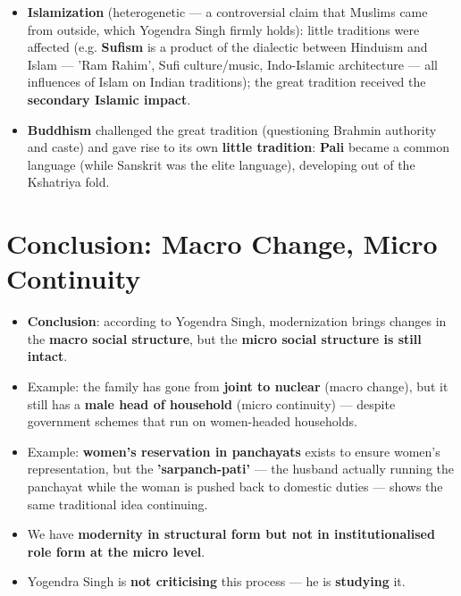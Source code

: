 \begin{KeyConcept}
\begin{itemize}
\item \textbf{Islamization} (heterogenetic --- a controversial claim that Muslims came from outside, which Yogendra Singh firmly holds): little traditions were affected (e.g. \textbf{Sufism} is a product of the dialectic between Hinduism and Islam --- 'Ram Rahim', Sufi culture/music, Indo-Islamic architecture --- all influences of Islam on Indian traditions); the great tradition received the \textbf{secondary Islamic impact}.
\item \textbf{Buddhism} challenged the great tradition (questioning Brahmin authority and caste) and gave rise to its own \textbf{little tradition}: \textbf{Pali} became a common language (while Sanskrit was the elite language), developing out of the Kshatriya fold.
\end{itemize}
\end{KeyConcept}

\section{Conclusion: Macro Change, Micro Continuity}

\begin{KeyConcept}
\begin{itemize}
\item \textbf{Conclusion}: according to Yogendra Singh, modernization brings changes in the \textbf{macro social structure}, but the \textbf{micro social structure is still intact}.
\item Example: the family has gone from \textbf{joint to nuclear} (macro change), but it still has a \textbf{male head of household} (micro continuity) --- despite government schemes that run on women-headed households.
\item Example: \textbf{women's reservation in panchayats} exists to ensure women's representation, but the \textbf{'sarpanch-pati'} --- the husband actually running the panchayat while the woman is pushed back to domestic duties --- shows the same traditional idea continuing.
\item We have \textbf{modernity in structural form but not in institutionalised role form at the micro level}.
\item Yogendra Singh is \textbf{not criticising} this process --- he is \textbf{studying} it.
\end{itemize}
\end{KeyConcept}

